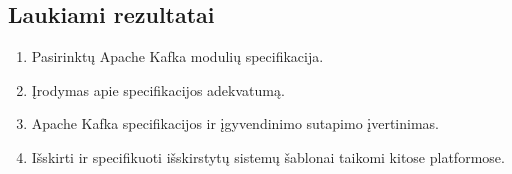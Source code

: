 \documentclass{VUMIFPSmagistrinis}
\begin{document}
	\subsection{Laukiami rezultatai}
		\begin{enumerate}
			\item{Pasirinktų Apache Kafka modulių specifikacija.}
			\item{Įrodymas apie specifikacijos adekvatumą.}
			\item{Apache Kafka specifikacijos ir įgyvendinimo sutapimo įvertinimas.}
			\item{Išskirti ir specifikuoti išskirstytų sistemų šablonai taikomi kitose platformose.}
		\end{enumerate}
	
	\printbibliography[heading=bibintoc] 


\appendix
\end{document}
